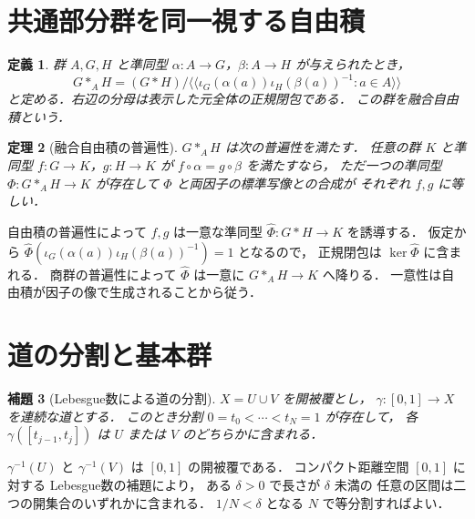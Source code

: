 \documentclass[a5paper,10pt,onecolumn]{jsarticle}
\makeatletter
\theoremstyle{mathnotetheorem}
\newtheorem{theorem}{定理}[section]
\newtheorem{definition}[theorem]{定義}
\newtheorem{lemma}[theorem]{補題}
\renewcommand{\proofname}{証明}
\renewenvironment{proof}[1][\proofname]{%
  \par\pushQED{\qed}\normalfont\topsep4\p@\@plus2\p@\relax
  \trivlist\item[\hskip\labelsep\bfseries #1]\ignorespaces
}{\popQED\endtrivlist\@endpefalse}
\makeatother
\begin{document}
\section{共通部分群を同一視する自由積}

\begin{definition}
群 $A,G,H$ と準同型
$\alpha:A\to G$，$\beta:A\to H$ が与えられたとき，
\[
 G*_A H
 =(G*H)/\langle\!\langle
 \iota_G(\alpha(a))\iota_H(\beta(a))^{-1}:
 a\in A\rangle\!\rangle
\]
と定める．右辺の分母は表示した元全体の正規閉包である．
この群を\emph{融合自由積}という．
\end{definition}

\begin{theorem}[融合自由積の普遍性]\label{thm:amalgam-universal}
$G*_A H$ は次の普遍性を満たす．
任意の群 $K$ と準同型
$f:G\to K$，$g:H\to K$ が
$f\circ\alpha=g\circ\beta$ を満たすなら，
ただ一つの準同型
$\Phi:G*_A H\to K$ が存在して
$\Phi$ と両因子の標準写像との合成が
それぞれ $f,g$ に等しい．
\end{theorem}
\begin{proof}
自由積の普遍性によって
$f,g$ は一意な準同型
$\widehat\Phi:G*H\to K$ を誘導する．
仮定から
$\widehat\Phi(\iota_G(\alpha(a))
\iota_H(\beta(a))^{-1})=1$ となるので，
正規閉包は $\ker\widehat\Phi$ に含まれる．
商群の普遍性によって
$\widehat\Phi$ は一意に $G*_A H\to K$ へ降りる．
一意性は自由積が因子の像で生成されることから従う．
\end{proof}

\section{道の分割と基本群}

\begin{lemma}[Lebesgue数による道の分割]\label{lem:path-subdivide}
$X=U\cup V$ を開被覆とし，
$\gamma:[0,1]\to X$ を連続な道とする．
このとき分割
$0=t_0<\cdots<t_N=1$ が存在して，
各 $\gamma([t_{j-1},t_j])$ は
$U$ または $V$ のどちらかに含まれる．
\end{lemma}
\begin{proof}
$\gamma^{-1}(U)$ と $\gamma^{-1}(V)$ は
$[0,1]$ の開被覆である．
コンパクト距離空間 $[0,1]$ に対する
Lebesgue数の補題により，
ある $\delta>0$ で長さが $\delta$ 未満の
任意の区間は二つの開集合のいずれかに含まれる．
$1/N<\delta$ となる $N$ で等分割すればよい．
\end{proof}
\end{document}
